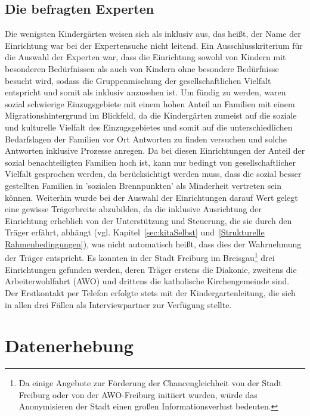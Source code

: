 \subsection{Die befragten Experten}
Die wenigsten Kindergärten weisen sich als inklusiv aus, das heißt, der Name der Einrichtung war bei der Expertensuche nicht leitend. Ein Ausschlusskriterium für die Auswahl der Experten war, dass die Einrichtung sowohl von Kindern mit besonderen Bedürfnissen als auch von Kindern ohne besondere Bedürfnisse besucht wird, sodass die Gruppenmischung der gesellschaftlichen Vielfalt entspricht und somit als inklusiv anzusehen ist. Um fündig zu werden, waren sozial schwierige Einzugsgebiete mit einem hohen Anteil an Familien mit einem Migrationshintergrund im Blickfeld, da die Kindergärten zumeist auf die soziale und kulturelle Vielfalt des Einzugsgebietes und somit auf die unterschiedlichen Bedarfslagen der Familien vor Ort Antworten zu finden versuchen und solche Antworten inklusive Prozesse anregen. Da bei diesen Einrichtungen der Anteil der sozial benachteiligten Familien hoch ist, kann nur bedingt von gesellschaftlicher Vielfalt gesprochen werden, da berücksichtigt werden muss, dass die sozial besser gestellten Familien in ’sozialen Brennpunkten’ als Minderheit vertreten sein können.    
Weiterhin wurde bei der Auswahl der Einrichtungen darauf Wert gelegt eine gewisse Trägerbreite abzubilden, da die inklusive Ausrichtung der Einrichtung erheblich von der Unterstützung und Steuerung, die sie durch den Träger erfährt, abhängt (vgl. Kapitel~\ref{sec:kitaSelbst} und~\ref{Strukturelle Rahmenbedingungen}), was nicht automatisch heißt, dass dies der Wahrnehmung der Träger entspricht. Es konnten in der Stadt Freiburg im Breisgau\footnote{Da einige Angebote zur Förderung der Chancengleichheit von der Stadt Freiburg oder von der AWO-Freiburg initiiert wurden, würde das Anonymisieren der Stadt einen großen Informationsverlust bedeuten.} drei Einrichtungen gefunden werden, deren Träger erstens die Diakonie, zweitens die Arbeiterwohlfahrt (AWO) und drittens die katholische Kirchengemeinde sind. Der Erstkontakt per Telefon erfolgte stets mit der Kindergartenleitung, die sich in allen drei Fällen als Interviewpartner zur Verfügung stellte. 

\section{Datenerhebung}
